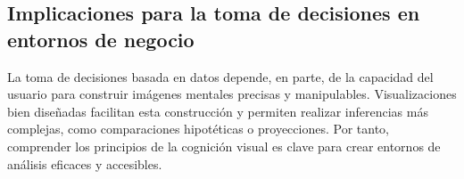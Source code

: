 \documentclass[12pt]{article}
\begin{document}
\subsection{Implicaciones para la toma de decisiones en entornos de negocio}
La toma de decisiones basada en datos depende, en parte, de la capacidad del usuario para construir imágenes mentales precisas y manipulables. Visualizaciones bien diseñadas facilitan esta construcción y permiten realizar inferencias más complejas, como comparaciones hipotéticas o proyecciones. Por tanto, comprender los principios de la cognición visual es clave para crear entornos de análisis eficaces y accesibles.


\printbibliography
\end{document}
